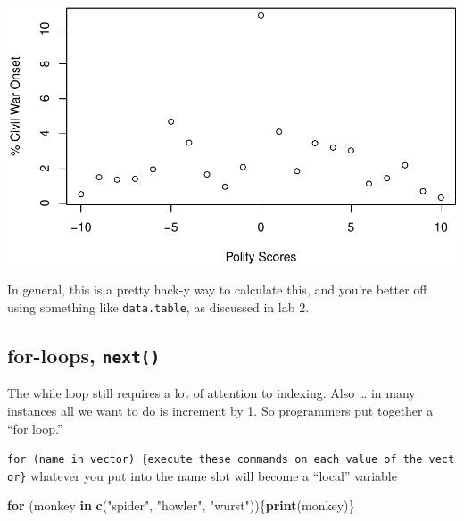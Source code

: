 \documentclass[]{article}
\newenvironment{Shaded}{\begin{snugshade}}{\end{snugshade}}
\newcommand{\KeywordTok}[1]{\textcolor[rgb]{0.13,0.29,0.53}{\textbf{#1}}}
\newcommand{\DataTypeTok}[1]{\textcolor[rgb]{0.13,0.29,0.53}{#1}}
\newcommand{\DecValTok}[1]{\textcolor[rgb]{0.00,0.00,0.81}{#1}}
\newcommand{\StringTok}[1]{\textcolor[rgb]{0.31,0.60,0.02}{#1}}
\newcommand{\ControlFlowTok}[1]{\textcolor[rgb]{0.13,0.29,0.53}{\textbf{#1}}}
\newcommand{\OperatorTok}[1]{\textcolor[rgb]{0.81,0.36,0.00}{\textbf{#1}}}
\newcommand{\NormalTok}[1]{#1}
\begin{document}
\begin{Shaded}
\end{Shaded}

\includegraphics{Lab4_Matrix_Algebra_Functions_files/figure-latex/FL1-1.pdf}

In general, this is a pretty hack-y way to calculate this, and you're
better off using something like \texttt{data.table}, as discussed in lab
2.

\clearpage

\subsection{\texorpdfstring{for-loops,
\texttt{next()}}{for-loops, next()}}\label{for-loops-next}

The while loop still requires a lot of attention to indexing. Also
\ldots{} in many instances all we want to do is increment by 1. So
programmers put together a ``for loop.''

\texttt{for\ (name\ in\ vector)\ \{execute\ these\ commands\ on\ each\ value\ of\ the\ vector\}}
whatever you put into the name slot will become a ``local'' variable

\begin{Shaded}
\begin{Highlighting}[]
\ControlFlowTok{for}\NormalTok{ (monkey }\ControlFlowTok{in} \KeywordTok{c}\NormalTok{(}\StringTok{"spider"}\NormalTok{, }\StringTok{"howler"}\NormalTok{, }\StringTok{"wurst"}\NormalTok{))\{}\KeywordTok{print}\NormalTok{(monkey)\}}
\end{Highlighting}
\end{Shaded}
\end{document}
